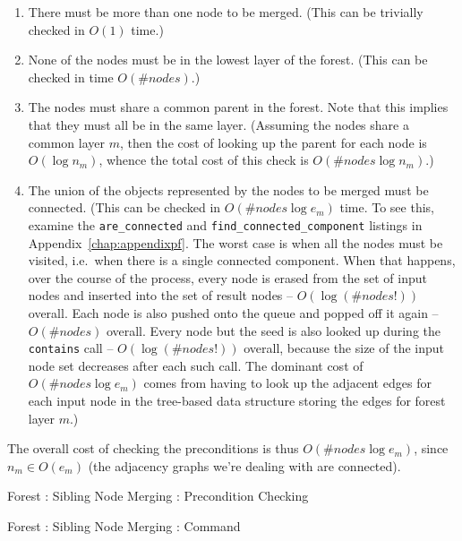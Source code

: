 \begin{enumerate}

\item There must be more than one node to be merged. (This can be trivially checked in $O(1)$ time.)
\item None of the nodes must be in the lowest layer of the forest. (This can be checked in time $O(\#\mathit{nodes})$.)
\item The nodes must share a common parent in the forest. Note that this implies that they must all be in the same layer. (Assuming the nodes share a common layer $m$, then the cost of looking up the parent for each node is $O(\log n_m)$, whence the total cost of this check is $O(\#\mathit{nodes} \log n_m)$.)
\item The union of the objects represented by the nodes to be merged must be connected. (This can be checked in $O(\#\mathit{nodes} \log e_m)$ time. To see this, examine the \texttt{are_connected} and \texttt{find_connected_component} listings in Appendix~\ref{chap:appendixpf}. The worst case is when all the nodes must be visited, i.e.~when there is a single connected component. When that happens, over the course of the process, every node is erased from the set of input nodes and inserted into the set of result nodes -- $O(\log (\#\mathit{nodes}!))$ overall. Each node is also pushed onto the queue and popped off it again -- $O(\#\mathit{nodes})$ overall. Every node but the seed is also looked up during the \texttt{contains} call -- $O(\log (\#\mathit{nodes}!))$ overall, because the size of the input node set decreases after each such call. The dominant cost of $O(\#\mathit{nodes} \log e_m)$ comes from having to look up the adjacent edges for each input node in the tree-based data structure storing the edges for forest layer $m$.)

\end{enumerate}

\noindent The overall cost of checking the preconditions is thus $O(\#\mathit{nodes} \log e_m)$, since $n_m \in O(e_m)$ (the adjacency graphs we're dealing with are connected).

\begin{stulisting}[p]
\caption{Forest : Sibling Node Merging : Precondition Checking}
\label{code:ipfs-forest-mergesiblingnodes}

\end{stulisting}

\begin{stulisting}[p]
\caption{Forest : Sibling Node Merging : Command}
\label{code:ipfs-forest-mergesiblingnodescommand}

\end{stulisting}

